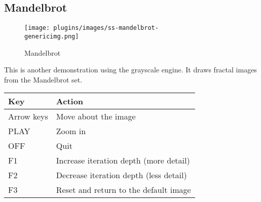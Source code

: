 \subsection{Mandelbrot}
\begin{figure}[h!]
\begin{center}
\texttt{[image: plugins/images/ss-mandelbrot-\\genericimg.png]}
\end{center}
\caption{Mandelbrot}
\end{figure}

This is another demonstration using the grayscale engine.  It draws fractal images from the Mandelbrot set.

\begin{table}[h!]
\begin{center}
\begin{tabular}{@{}ll@{}}\toprule
\textbf{Key} & \textbf{Action} \\\midrule
Arrow keys & Move about the image \\
PLAY & Zoom in \\
OFF & Quit \\
F1 & Increase iteration depth (more detail) \\
F2 & Decrease iteration depth (less detail) \\
F3 & Reset and return to the default image \\\bottomrule
\end{tabular}
\end{center}
\end{table}
